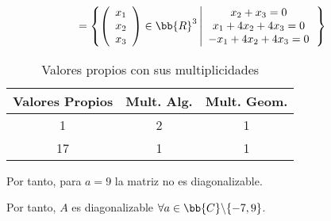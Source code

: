 \begin{ejercicio}
\begin{itemize}
\begin{equation*}
\begin{split}
               & = \left\{ \left(\begin{array}{c}
                    x_1 \\
                    x_2  \\
                    x_3
               \end{array}\right) \in \bb{R}^3 \left| \begin{array}{c}
                    x_2+x_3=0 \\
                    x_1+4x_2+4x_3 = 0 \\
                    -x_1+4x_2+4x_3 = 0
               \end{array}\right. \right\}
           \end{split}\end{equation*}
           \begin{table}[H]
                \centering
                \begin{tabular}{c|c|c}
                    Valores Propios & Mult. Alg. & Mult. Geom. \\ \hline 
                    1 & 2 & 1\\
                    17 & 1 & 1\\
                \end{tabular}
                \caption{Valores propios con sus multiplicidades}
            \end{table}
            Por tanto, para $a=9$ la matriz no es diagonalizable.
    \end{itemize}

    Por tanto, $A$ es diagonalizable $\forall a \in \bb{C} \backslash \{-7,9\}$.
\end{ejercicio}

